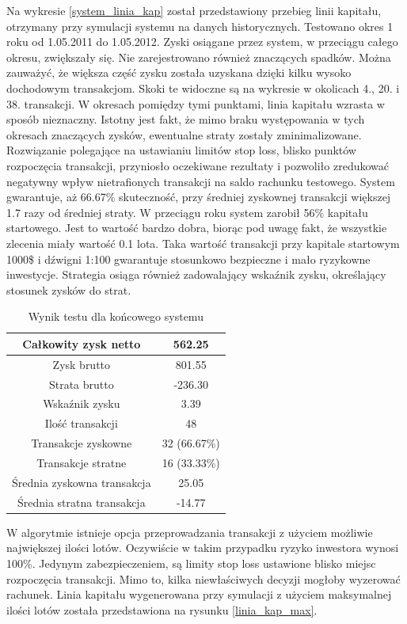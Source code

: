 \documentclass[pdflatex,11pt]{aghdpl}
\begin{document}
Na wykresie \ref{system_linia_kap} został przedstawiony przebieg linii kapitału, otrzymany przy symulacji systemu na danych historycznych. Testowano okres 1 roku od 1.05.2011 do 1.05.2012. Zyski osiągane przez system, w przeciągu całego okresu, zwiększały się. Nie zarejestrowano również znaczących spadków. Można zauważyć, że większa część zysku została uzyskana dzięki kilku wysoko dochodowym transakcjom. Skoki te widoczne są na wykresie w okolicach 4., 20. i 38. transakcji. W okresach pomiędzy tymi punktami, linia kapitału wzrasta w sposób nieznaczny. Istotny jest fakt, że mimo braku występowania w tych okresach znaczących zysków, ewentualne straty zostały zminimalizowane. Rozwiązanie polegające na ustawianiu limitów stop loss, blisko punktów rozpoczęcia transakcji, przyniosło oczekiwane rezultaty i pozwoliło zredukować negatywny wpływ nietrafionych transakcji na saldo rachunku testowego. System gwarantuje, aż 66.67\% skuteczność, przy średniej zyskownej transakcji większej 1.7 razy od średniej straty. W przeciągu roku system zarobił 56\% kapitału startowego. Jest to wartość bardzo dobra, biorąc pod uwagę fakt, że wszystkie zlecenia miały wartość 0.1 lota. Taka wartość transakcji przy kapitale startowym 1000\$ i dźwigni 1:100 gwarantuje stosunkowo bezpieczne i mało ryzykowne inwestycje. Strategia osiąga również zadowalający wskaźnik zysku, określający stosunek zysków do strat. 
\begin{table}[h!]
\caption{Wynik testu dla końcowego systemu}
\begin{center}
\begin{tabular}{|c|c|}
\hline 
Całkowity zysk netto & 562.25\\
\hline
Zysk brutto & 801.55\\
\hline
Strata brutto & -236.30\\
\hline
Wskaźnik zysku & 3.39 \\
\hline
\hline
Ilość transakcji & 48 \\
\hline
Transakcje zyskowne & 32 (66.67\%) \\
\hline
Transakcje stratne & 16 (33.33\%) \\
\hline
\hline
Średnia zyskowna transakcja & 25.05 \\
\hline
Średnia stratna transakcja & -14.77 \\
\hline
\end{tabular} 
\label{raport_system}
\end{center}
\end{table}
W algorytmie istnieje opcja przeprowadzania transakcji z użyciem możliwie największej ilości lotów. Oczywiście w takim przypadku ryzyko inwestora wynosi 100\%. Jedynym zabezpieczeniem, są limity stop loss ustawione blisko miejsc rozpoczęcia transakcji. Mimo to, kilka niewłaściwych decyzji mogłoby wyzerować rachunek. Linia kapitału wygenerowana przy symulacji z użyciem maksymalnej ilości lotów została przedstawiona na rysunku \ref{linia_kap_max}.
\end{document}
